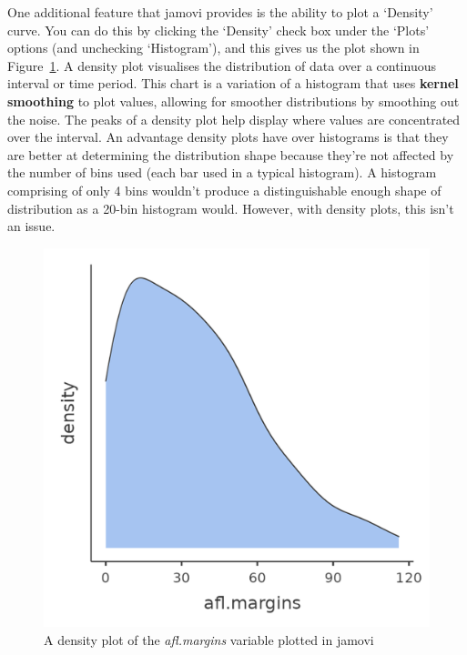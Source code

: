 \documentclass[
  a4paper,
]{book}
\begin{document}
One additional feature that jamovi provides is the ability to plot a
`Density' curve. You can do this by clicking the `Density' check box
under the `Plots' options (and unchecking `Histogram'), and this gives
us the plot shown in Figure~\ref{fig-fig5-3}. A density plot visualises
the distribution of data over a continuous interval or time period. This
chart is a variation of a histogram that uses \textbf{kernel smoothing}
to plot values, allowing for smoother distributions by smoothing out the
noise. The peaks of a density plot help display where values are
concentrated over the interval. An advantage density plots have over
histograms is that they are better at determining the distribution shape
because they're not affected by the number of bins used (each bar used
in a typical histogram). A histogram comprising of only 4 bins wouldn't
produce a distinguishable enough shape of distribution as a 20-bin
histogram would. However, with density plots, this isn't an issue.

\begin{figure}

\includegraphics[width=1\textwidth,height=\textheight]{images/fig5-3.png} \hfill{}

\caption{\label{fig-fig5-3}A density plot of the \emph{afl.margins}
variable plotted in jamovi}

\end{figure}
\end{document}
